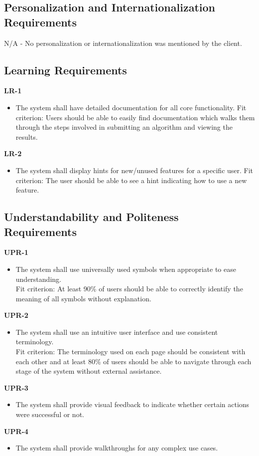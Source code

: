 \documentclass[12pt]{article}
\begin{document}
\subsection{Personalization and Internationalization Requirements}
N/A - No personalization or internationalization was mentioned by the client.
\subsection{Learning Requirements}
\textbf{LR-1}
\begin{itemize}
    \item The system shall have detailed documentation for all core functionality. \hfill \break
    Fit criterion: Users should be able to easily find documentation which walks them through the steps involved in submitting an algorithm and viewing the results.
\end{itemize}
\textbf{LR-2}
\begin{itemize}
    \item The system shall display hints for new/unused features for a specific user. \hfill \break
    Fit criterion: The user should be able to see a hint indicating how to use a new feature.
\end{itemize}

\subsection{Understandability and Politeness Requirements}
\textbf{UPR-1}
\begin{itemize}
    \item The system shall use universally used symbols when appropriate to ease understanding. \\
    Fit criterion: At least 90\% of users should be able to correctly identify the meaning of all symbols without explanation. 
\end{itemize}
\textbf{UPR-2}
\begin{itemize}
    \item The system shall use an intuitive user interface and use consistent terminology. \\
    Fit criterion: The terminology used on each page should be consistent with each other and at least 80\% of users should be able to navigate through each stage of the system without external assistance. 
\end{itemize}
\textbf{UPR-3}
\begin{itemize}
    \item The system shall provide visual feedback to indicate whether certain actions were successful or not.
\end{itemize}
\textbf{UPR-4}
\begin{itemize}
    \item The system shall provide walkthroughs for any complex use cases.
\end{itemize}
\end{document}

